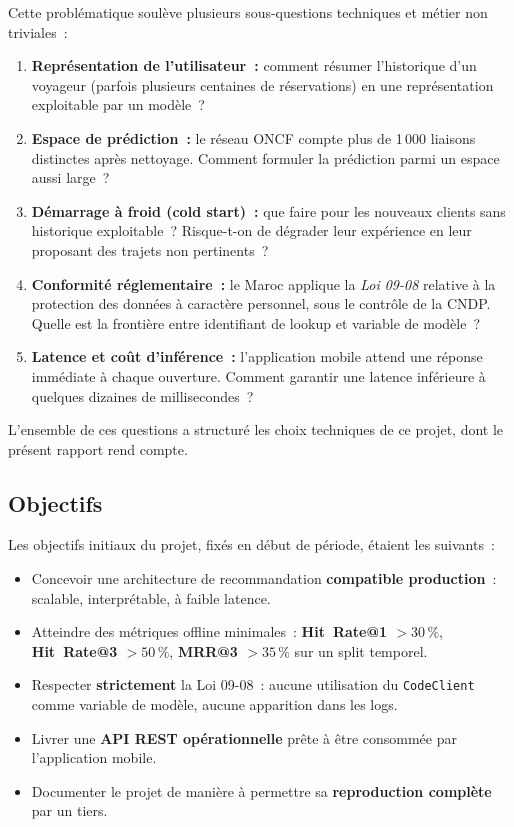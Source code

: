 \documentclass[11pt, a4paper]{article}
\begin{document}
Cette problématique soulève plusieurs sous-questions techniques et métier
non triviales~:
\begin{enumerate}
\item \textbf{Représentation de l'utilisateur~:} comment résumer
    l'historique d'un voyageur (parfois plusieurs centaines de
    réservations) en une représentation exploitable par un modèle~?
\item \textbf{Espace de prédiction~:} le réseau ONCF compte plus de
    1\,000 liaisons distinctes après nettoyage. Comment formuler la
    prédiction parmi un espace aussi large~?
\item \textbf{Démarrage à froid (cold start)~:} que faire pour les
    nouveaux clients sans historique exploitable~? Risque-t-on de
    dégrader leur expérience en leur proposant des trajets non
    pertinents~?
\item \textbf{Conformité réglementaire~:} le Maroc applique la
    \textit{Loi 09-08} relative à la protection des données à caractère
    personnel, sous le contrôle de la CNDP. Quelle est la frontière
    entre identifiant de lookup et variable de modèle~?
\item \textbf{Latence et coût d'inférence~:} l'application mobile attend
    une réponse immédiate à chaque ouverture. Comment garantir une
    latence inférieure à quelques dizaines de millisecondes~?
\end{enumerate}

L'ensemble de ces questions a structuré les choix techniques de ce
projet, dont le présent rapport rend compte.

\subsection{Objectifs}

Les objectifs initiaux du projet, fixés en début de période, étaient
les suivants~:
\begin{itemize}
\item Concevoir une architecture de recommandation \textbf{compatible
    production}~: scalable, interprétable, à faible latence.
\item Atteindre des métriques offline minimales~: \textbf{Hit~Rate@1
    $> 30\,\%$}, \textbf{Hit~Rate@3 $> 50\,\%$}, \textbf{MRR@3 $>
    35\,\%$} sur un split temporel.
\item Respecter \textbf{strictement} la Loi 09-08~: aucune utilisation
    du \texttt{CodeClient} comme variable de modèle, aucune apparition
    dans les logs.
\item Livrer une \textbf{API REST opérationnelle} prête à être consommée
    par l'application mobile.
\item Documenter le projet de manière à permettre sa
    \textbf{reproduction complète} par un tiers.
\end{itemize}
\end{document}

